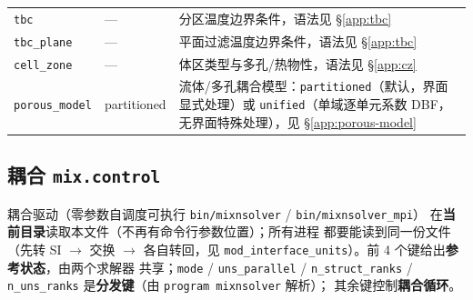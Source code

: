 {\begin{longtable}{@{}>{\raggedright\arraybackslash}p{}>{\raggedright\arraybackslash}p{}>{\raggedright\arraybackslash}p{}@{}}
\texttt{tbc}          & ---   & 分区温度边界条件，语法见 \S\ref{app:tbc} \\
\texttt{tbc\_plane}   & ---   & 平面过滤温度边界条件，语法见 \S\ref{app:tbc} \\
\texttt{cell\_zone}   & ---   & 体区类型与多孔/热物性，语法见 \S\ref{app:cz} \\
\texttt{porous\_model} & partitioned & 流体/多孔耦合模型：\texttt{partitioned}（默认，界面显式处理）或 \texttt{unified}（单域逐单元系数 DBF，无界面特殊处理），见 \S\ref{app:porous-model} \\
\end{longtable}
}

\subsection{耦合 \texttt{mix.control}}\label{app:mix-params}

耦合驱动（零参数自调度可执行 \texttt{bin/mixnsolver} / \texttt{bin/mixnsolver\_mpi}）
在\textbf{当前目录}读取本文件（不再有命令行参数位置）；所有进程
都要能读到同一份文件（先转 SI $\to$ 交换 $\to$ 各自转回，见
\texttt{mod\_interface\_units}）。前 4 个键给出{\bfseries 参考状态}，由两个求解器
共享；\texttt{mode} / \texttt{uns\_parallel} / \texttt{n\_struct\_ranks} /
\texttt{n\_uns\_ranks} 是\textbf{分发键}（由 \texttt{program mixnsolver} 解析）；
其余键控制{\bfseries 耦合循环}。

